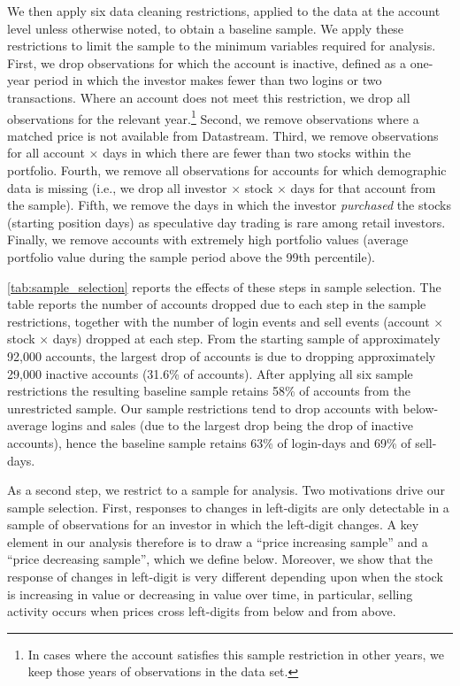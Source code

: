 We then apply six data cleaning restrictions, applied to the data at the account level unless otherwise noted, to obtain a baseline sample. We apply these restrictions to limit the sample to the minimum variables required for analysis. First, we drop observations for which the account is inactive, defined as a one-year period in which the investor makes fewer than two logins or two transactions. Where an account does not meet this restriction, we drop all observations for the relevant year.\footnote{In cases where the account satisfies this sample restriction in other years, we keep those years of observations in the data set.} Second, we remove observations where a matched price is not available from Datastream. Third, we remove observations for all account $\times$ days in which there are fewer than two stocks within the portfolio.  Fourth, we remove all observations for accounts for which demographic data is missing (i.e., we drop all investor $\times$ stock $\times$ days for that account from the sample). Fifth, we remove the days in which the investor \textit{purchased} the stocks (starting position days) as speculative day trading is rare among retail investors. Finally, we remove accounts with extremely high portfolio values (average portfolio value during the sample period above the 99th percentile).

\ref{tab:sample_selection} reports the effects of these steps in sample selection. The table reports the number of accounts dropped due to each step in the sample restrictions, together with the number of login events and sell events (account $\times$ stock $\times$ days) dropped at each step. From the starting sample of approximately 92,000 accounts, the largest drop of accounts is due to dropping approximately 29,000 inactive accounts (31.6\% of accounts). After applying all six sample restrictions the resulting baseline sample retains 58\% of accounts from the unrestricted sample. Our sample restrictions tend to drop accounts with below-average logins and sales (due to the largest drop being the drop of inactive accounts), hence the baseline sample retains 63\% of login-days and 69\% of sell-days. 

As a second step, we restrict to a sample for analysis. Two motivations drive our sample selection. First, responses to changes in left-digits are only detectable in a sample of observations for an investor in which the left-digit changes.  A key element in our analysis therefore is to draw a ``price increasing sample'' and a ``price decreasing sample'', which we define below. Moreover, we show that the response of changes in left-digit is very different depending upon when the stock is increasing in value or decreasing in value over time, in particular, selling activity occurs when prices cross left-digits from below and from above.


